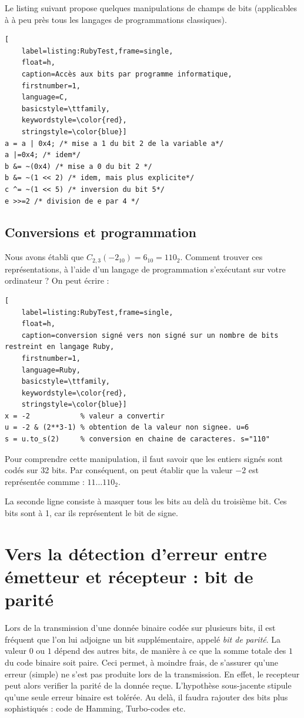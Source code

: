 Le listing suivant propose quelques manipulations de champs de bits (applicables à à peu près tous les langages de programmations classiques).

\begin{lstlisting}[
    label=listing:RubyTest,frame=single,
    float=h,
    caption=Accès aux bits par programme informatique,
    firstnumber=1,
    language=C,
    basicstyle=\ttfamily,
    keywordstyle=\color{red},
    stringstyle=\color{blue}]
a = a | 0x4; /* mise a 1 du bit 2 de la variable a*/
a |=0x4; /* idem*/
b &= ~(0x4) /* mise a 0 du bit 2 */
b &= ~(1 << 2) /* idem, mais plus explicite*/
c ^= ~(1 << 5) /* inversion du bit 5*/
e >>=2 /* division de e par 4 */
\end{lstlisting}



\subsection{Conversions et programmation}
Nous avons établi que $C_{2,3}(-2_{10})=6_{10}=110_2$. Comment trouver ces représentations,
à l'aide d'un langage de programmation s'exécutant sur votre ordinateur ? On peut écrire :

\begin{lstlisting}[
    label=listing:RubyTest,frame=single,
    float=h,
    caption=conversion signé vers non signé sur un nombre de bits restreint en langage Ruby,
    firstnumber=1,
    language=Ruby,
    basicstyle=\ttfamily,
    keywordstyle=\color{red},
    stringstyle=\color{blue}]
x = -2            % valeur a convertir
u = -2 & (2**3-1) % obtention de la valeur non signee. u=6
s = u.to_s(2)     % conversion en chaine de caracteres. s="110"
\end{lstlisting}

Pour comprendre cette manipulation, il faut savoir que les entiers signés sont codés sur 32 bits. Par conséquent, on peut établir
que la valeur $-2$ est représentée commme : $11\dots110_2$.

La seconde ligne consiste à masquer tous les bits au delà du troisième bit. Ces bits sont à 1, car ils représentent le bit
de signe.

\section{Vers la détection d'erreur entre émetteur et récepteur : bit de parité}
Lors de la transmission d'une donnée binaire codée sur plusieurs bits, il est fréquent que l'on lui adjoigne un bit supplémentaire, appelé {\it bit de parité}.
La valeur $0$ ou $1$ dépend des autres bits, de manière à ce que la somme totale des $1$ du code binaire soit paire. Ceci permet, à moindre frais, de s'assurer qu'une
erreur (simple) ne s'est pas produite lors de la transmission. En effet, le recepteur peut alors verifier la parité de la donnée reçue. L'hypothèse sous-jacente stipule
qu'une seule erreur binaire est tolérée. Au delà, il faudra rajouter des bits plus sophistiqués : code de Hamming, Turbo-codes etc.

